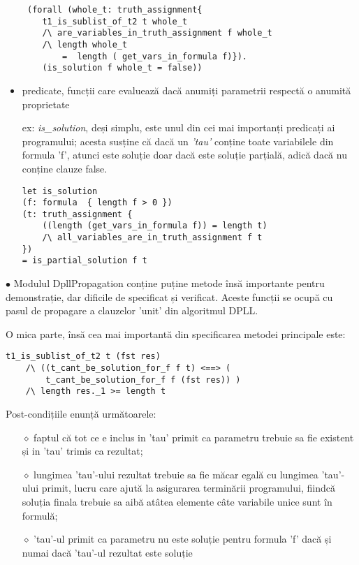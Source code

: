 \begin{itemize}
	\begin{lstlisting}
 (forall (whole_t: truth_assignment{ 
	t1_is_sublist_of_t2 t whole_t
	/\ are_variables_in_truth_assignment f whole_t 
	/\ length whole_t 
		=  length ( get_vars_in_formula f)}). 
	(is_solution f whole_t = false)) 
	\end{lstlisting}
	
	
	\item predicate, funcții care evaluează dacă anumiți parametrii respectă o anumită proprietate
	
	ex: \textit{is\_solution}, deși simplu, este unul din cei mai importanți predicați ai \newline programului; acesta susține că dacă un \textit{'tau'} conține toate variabilele din formula 'f', atunci este soluție doar dacă este soluție parțială, adică dacă nu conține clauze false.
	
	\begin{lstlisting}
let is_solution 
(f: formula  { length f > 0 })
(t: truth_assignment {
	((length (get_vars_in_formula f)) = length t)
	/\ all_variables_are_in_truth_assignment f t  
})
= is_partial_solution f t 
	\end{lstlisting}

\end{itemize}


$\bullet$ Modulul DpllPropagation conține puține metode însă importante pentru demonstrație, dar dificile de specificat și verificat. Aceste funcții se ocupă cu pasul de propagare a clauzelor 'unit' din algoritmul DPLL.

O mica parte, însă cea mai importantă din specificarea metodei principale este:

\begin{lstlisting}[]
	t1_is_sublist_of_t2 t (fst res)
	/\ ((t_cant_be_solution_for_f f t) <==> (    
		t_cant_be_solution_for_f f (fst res)) )
 	/\ length res._1 >= length t

\end{lstlisting}
	
Post-condițiile enunță următoarele: 
\begin{itemize}
	\item[$\diamond$]  faptul că tot ce e inclus in 'tau' primit ca parametru trebuie sa fie existent și in 'tau' trimis ca rezultat; 
	
	\item[$\diamond$] lungimea 'tau'-ului rezultat trebuie sa fie măcar egală cu lungimea 'tau'-ului primit, lucru care ajută la asigurarea terminării programului, fiindcă soluția finala trebuie sa aibă atâtea elemente câte variabile unice sunt în formulă;
	
	\item[$\diamond$] 'tau'-ul primit ca parametru nu este soluție pentru formula 'f' dacă și numai dacă 'tau'-ul rezultat este soluție
\end{itemize}

